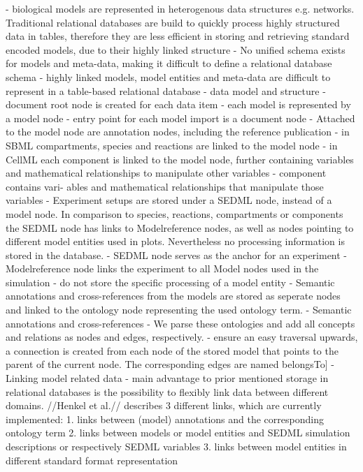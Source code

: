	- \cite{Henkel2015} biological models are represented in heterogenous data structures e.g. networks. Traditional relational databases are build to quickly process highly structured data in tables, therefore they are less efficient in storing and retrieving standard encoded models, due to their highly linked structure
		- \cite{Henkel2015} No unified schema exists for models and meta-data, making it difficult to define a relational database schema
		- \cite{Henkel2015} highly linked models, model entities and meta-data are difficult to represent in a table-based relational database
	- \masymos data model and structure
		- \cite{Henkel2015} document root node is created for each data item
		- each model is represented by a model node
			- entry point for each model import is a document node
		- \cite{Henkel2015} Attached to the model node are annotation nodes, including the reference publication
		- in SBML compartments, species and reactions are linked to the model node
		- in CellML each component is linked to the model node, further containing variables and mathematical relationships to manipulate other variables
			- \cite{Henkel2015} component contains vari- ables and mathematical relationships that manipulate those variables
		- Experiment setups are stored under a SEDML node, instead of a model node. In comparison to species, reactions, compartments or components the SEDML node has links to Modelreference nodes, as well as nodes pointing to different model entities used in plots. Nevertheless no processing information is stored in the database.
			- \cite{Henkel2015} SEDML node serves as the anchor for an experiment
			- \cite{Henkel2015} Modelreference node links the experiment to all Model nodes used in the simulation
			- \cite{Henkel2015} do not store the specific processing of a model entity
		- Semantic annotations and cross-references from the models are stored as seperate nodes and linked to the ontology node representing the used ontology term.
			- \cite{Henkel2015} Semantic annotations and cross-references
			- \cite{Henkel2015} We parse these ontologies and add all concepts and relations as nodes and edges, respectively.
		- ensure an easy traversal upwards, a connection is created from each node of the stored model that points to the parent of the current node. The corresponding edges are named belongsTo]
	- Linking model related data
		- main advantage to prior mentioned storage in relational databases is the possibility to flexibly link data between different domains. //Henkel et al.// describes 3 different links, which are currently implemented: 1. links between (model) annotations and the corresponding ontology term 2. links between models or model entities and SEDML simulation descriptions or respectively SEDML variables 3. links between model entities in different standard format representation

